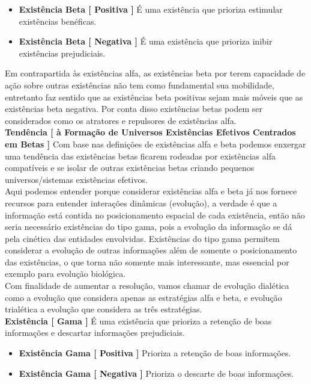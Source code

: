\documentclass[10pt,a4paper]{report}
\begin{document}
\begin{itemize}
	\item[ (i) ] \textbf{Existência Beta [ Positiva ]} É uma existência que prioriza estimular existências benéficas.
	\item[ (ii) ] \textbf{Existência Beta [ Negativa ]} É uma existência que prioriza inibir existências prejudiciais.
\end{itemize}

Em contrapartida às existências alfa, as existências beta por terem capacidade de ação sobre outras existências não tem como fundamental sua mobilidade, entretanto faz sentido que as existências beta positivas sejam mais móveis que as existências beta negativa. Por conta disso existências betas podem ser considerados como os atratores e repulsores de existências alfa. \\

\textbf{Tendência [ à Formação de Universos Existências Efetivos Centrados em Betas ]} Com base nas definições de existências alfa e beta podemos enxergar uma tendência das existências betas ficarem rodeadas por existências alfa compatíveis e se isolar de outras existências betas criando pequenos universos/sistemas existências efetivos.\\

Aqui podemos entender porque considerar existências alfa e beta já nos fornece recursos para entender interações dinâmicas (evolução), a verdade é que a informação está contida no posicionamento espacial de cada existência, então não seria necessário existências do tipo gama, pois a evolução da informação se dá pela cinética das entidades envolvidas. Existências do tipo gama permitem considerar a evolução de outras informações além de somente o posicionamento das existências, o que torna não somente mais interessante, mas essencial por exemplo para evolução biológica. \\

Com finalidade de aumentar a resolução, vamos chamar de evolução dialética como a evolução que considera apenas as estratégias alfa e beta, e evolução trialética a evolução que considera as três estratégias.\\

\textbf{Existência [ Gama ]} É uma existência que prioriza a retenção de boas informações e descartar informações prejudiciais.

\begin{itemize}
	\item[ (i) ] \textbf{Existência Gama [ Positiva ]} Prioriza a retenção de boas informações.
	\item[ (ii) ] \textbf{Existência Gama [ Negativa ]} Prioriza o descarte de boas informações.
\end{itemize}
\end{document}
